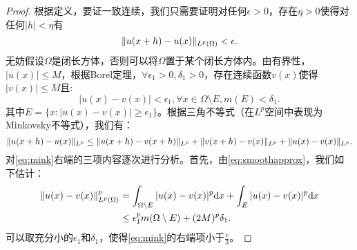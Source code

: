 \begin{proof}
    根据定义，要证一致连续，我们只需要证明对任何$\epsilon>0$，存在$\eta>0$使得对任何$|h|<\eta$有
    \begin{equation}
        \label{eq:uniformcont}
        \|u(x+h)-u(x)\|_{L^{p}(\Omega)}<\epsilon.
    \end{equation}
    无妨假设$\Omega$是闭长方体，否则可以将$\Omega$置于某个闭长方体内。由有界性，$|u(x)|\le M$，根据Borel定理，$\forall\epsilon_{1}>0,\delta_{1}>0$，存在连续函数$v(x)$使得$|v(x)|\le M$且:
    \begin{equation}
        \label{eq:smoothapprox}
        |u(x)-v(x)|<\epsilon_{1},\forall x\in\Omega\setminus E,m(E)<\delta_{1}.
    \end{equation}
    其中$E=\{x:|u(x)-v(x)|\ge\epsilon_{1}\}$。根据三角不等式（在$L^{p}$空间中表现为Minkovsky不等式），我们有：
    \begin{equation}
        \label{eq:mink}
        \|u(x+h)-u(x)\|_{L^{p}}\le\|u(x+h)-v(x+h)\|_{L^{p}}+\|v(x+h)-v(x)\|_{L^{p}}+\|u(x)-v(x)\|_{L^{p}}.
    \end{equation}
    对\eqref{eq:mink}右端的三项内容逐次进行分析。首先，由\eqref{eq:smoothapprox}，我们如下估计：
    \begin{equation}
        \begin{aligned}
            \|u(x)-v(x)\|_{L^{p}(\Omega)}^{p}&=\int_{\Omega\setminus E}|u(x)-v(x)|^{p}\mathrm{d} x+\int_{E}|u(x)-v(x)|^{p}\mathrm{d} x\\
            &\le\epsilon_{1}^{p}m(\Omega\setminus E)+(2M)^{p}\delta_{1}.
        \end{aligned}
    \end{equation}
    可以取充分小的$\epsilon_{1}$和$\delta_{1}$，使得\eqref{eq:mink}的右端项小于$\frac{\epsilon}{3}$。


\end{proof}
